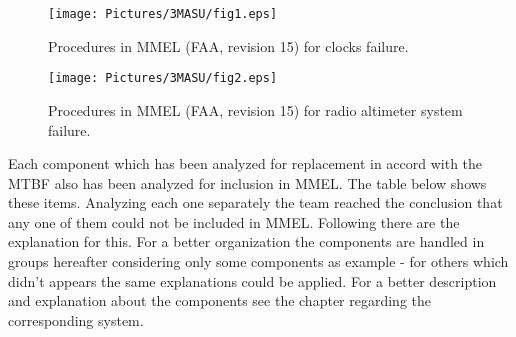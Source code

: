 \begin{figure}[H]
	\centering
	\texttt{[image: Pictures/3MASU/fig1.eps]}
    \caption{Procedures in MMEL (FAA, revision 15) for clocks failure.}
	\label{fig:MMELExample}
\end{figure}

\begin{figure}[H]
	\centering
	\texttt{[image: Pictures/3MASU/fig2.eps]}
	\caption{Procedures in MMEL (FAA, revision 15) for radio altimeter system failure.}
	\label{fig:MMELExample2}
\end{figure}

Each component which has been analyzed for replacement in accord with the MTBF also has been analyzed for inclusion in MMEL. The table below shows these items.
Analyzing each one separately the team reached the conclusion that any one of them could not be included in MMEL. Following there are the explanation for this. For a better organization the components are handled in groups hereafter considering only some components as example - for others which didn't appears the same explanations could be applied. For a better description and explanation about the components see the chapter regarding the corresponding system.

